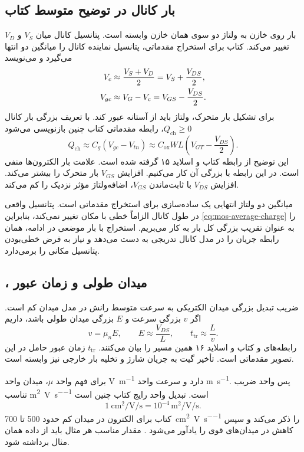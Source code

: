 \subsection{بار کانال در توضیح متوسط کتاب}
بار روی خازن به ولتاژ دو سوی همان خازن وابسته است. پتانسیل کانال میان
\(V_S\) و \(V_D\) تغییر می‌کند. کتاب برای استخراج مقدماتی، پتانسیل نماینده کانال
را میانگین دو انتها می‌گیرد و می‌نویسد
\begin{align}
 V_c&\approx\frac{V_S+V_D}{2}=V_S+\frac{V_{DS}}2,\notag\\
 V_{gc}&\approx V_G-V_c=V_{GS}-\frac{V_{DS}}2.
 \label{eq:mos-mean-potential}
\end{align}
برای تشکیل بار متحرک، ولتاژ باید از آستانه عبور کند. با تعریف بزرگی بار کانال
\(Q_{\mathrm{ch}}\ge0\)، رابطه مقدماتی کتاب چنین بازنویسی می‌شود
\begin{equation}
 Q_{\mathrm{ch}}\approx C_g(V_{gc}-V_{tn})
 \approx C_{\mathrm{ox}}WL\left(V_{GT}-\frac{V_{DS}}2\right).
 \label{eq:mos-average-charge}
\end{equation}
این توضیح از رابطه  کتاب و اسلاید ۱۵ گرفته شده است.
علامت بار الکترون‌ها منفی است. در این رابطه با بزرگی آن کار می‌کنیم.
افزایش \(V_{GS}\) بار متحرک را بیشتر می‌کند. افزایش \(V_{DS}\) با ثابت‌ماندن
\(V_{GS}\)، اضافه‌ولتاژ مؤثر نزدیک  را کم می‌کند.

میانگین دو ولتاژ انتهایی یک ساده‌سازی برای استخراج مقدماتی است.
پتانسیل واقعی در طول کانال الزاماً خطی با مکان تغییر نمی‌کند، بنابراین
\eqref{eq:mos-average-charge} را به عنوان تقریب بزرگی کل بار به کار می‌بریم.
استخراج با بار موضعی در ادامه، همان رابطه جریان را در مدل کانال تدریجی به دست می‌دهد
و نیاز به فرض خطی‌بودن پتانسیل مکانی را برمی‌دارد.

\subsection{، میدان طولی و زمان عبور}
 ضریب تبدیل بزرگی میدان الکتریکی به سرعت متوسط رانش در مدل میدان
کم است. اگر \(v\) بزرگی سرعت و \(E\) بزرگی میدان طولی باشد، داریم
\begin{equation}
 v=\mu_n E,\qquad E\approx\frac{V_{DS}}L,\qquad
 t_{\mathrm{tr}}\approx\frac Lv.
 \label{eq:mos-drift}
\end{equation}
رابطه‌های  و  کتاب و اسلاید ۱۶ همین مسیر را بیان می‌کنند.
\(t_{\mathrm{tr}}\) زمان عبور حامل در این تصویر مقدماتی است. تأخیر گیت به جریان
شارژ و تخلیه بار خارجی نیز وابسته است.

برای فهم واحد \(\mu\)، میدان واحد \unit{\volt\per\metre} دارد و سرعت واحد
\unit{\metre\per\second}. پس واحد ضریب تناسب
\unit{\metre\squared\per\volt\per\second} است. تبدیل واحد رایج کتاب چنین است
\begin{equation*}
 \qty{1}{\centi\metre\squared\per\volt\per\second}
 =10^{-4}\,\unit{\metre\squared\per\volt\per\second}.
\end{equation*}
کتاب برای الکترون در میدان کم حدود \num{500} تا
\qty{700}{\centi\metre\squared\per\volt\per\second}
را ذکر می‌کند و سپس کاهش  در میدان‌های قوی را یادآور می‌شود
\cite[صفحه ۶۶]{weste}. مقدار مناسب هر مثال باید از داده همان مثال برداشته شود.

